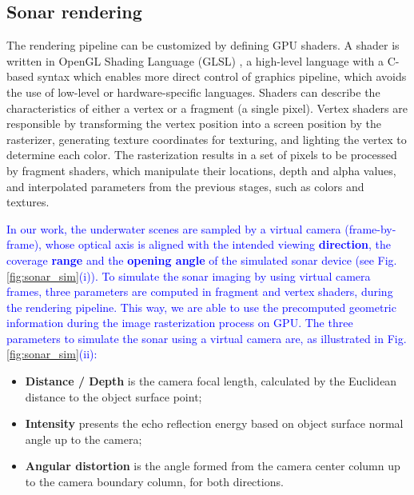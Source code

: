 \documentclass[final,5p,times]{elsarticle}
\begin{document}

\subsection{Sonar rendering}
\label{dev:shader}

The rendering pipeline can be customized by defining GPU shaders. A shader is written in OpenGL Shading Language (GLSL) \cite{rost2009}, a high-level language with a C-based syntax which enables more direct control of graphics pipeline, which avoids the use of low-level or hardware-specific languages. Shaders can describe the characteristics of either a vertex or a fragment (a single pixel). Vertex shaders are responsible by transforming the vertex position into a screen position by the rasterizer, generating texture coordinates for texturing, and lighting the vertex to determine each color. The rasterization results in a set of pixels to be processed by fragment shaders, which manipulate their locations, depth and alpha values, and interpolated parameters from the previous stages, such as colors and textures.

\textcolor{blue}{In our work, the underwater scenes are sampled by a virtual camera (frame-by-frame), whose
optical axis is aligned with the intended viewing \textbf{direction}, the coverage \textbf{range} and the \textbf{opening angle} of the simulated sonar device (see Fig. \ref{fig:sonar_sim}(i)). To simulate the sonar imaging by using virtual camera frames, three parameters are computed in fragment and vertex shaders, during the rendering pipeline. This way, we are able to use the precomputed geometric information during the image rasterization process on GPU. The three parameters to simulate the sonar using a virtual camera are, as illustrated in Fig. \ref{fig:sonar_sim}(ii):}

\begin{itemize}[]
    \item \textbf{Distance / Depth} is the camera focal length, calculated by the
    Euclidean distance to the object surface point; %
    \item \textbf{Intensity} presents the echo reflection energy based
    on object surface normal angle up to the camera; %
    \item \textbf{Angular distortion} is the angle formed from the camera
    center column up to the camera boundary column, for both directions. %
\end{itemize}
\end{document}
